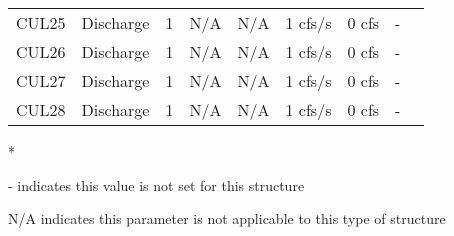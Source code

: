 \begin{table}[h]
\begin{tabular}{@{}lcccccccc@{}}
{CUL25}         & Discharge     & 1        & N/A         & N/A          & 1 cfs/s         & 0 cfs           & -            \\
{CUL26}         & Discharge     & 1        & N/A         & N/A          & 1 cfs/s         & 0 cfs           & -            \\
{CUL27}         & Discharge     & 1        & N/A         & N/A          & 1 cfs/s         & 0 cfs           & -            \\
{CUL28}         & Discharge     & 1        & N/A         & N/A          & 1 cfs/s         & 0 cfs           & -            \\
\hline
\end{tabular}

* \cite{corp2005}

- indicates this value is not set for this structure

N/A indicates this parameter is not applicable to this type of structure
\end{table}
\normalsize
\clearpage



